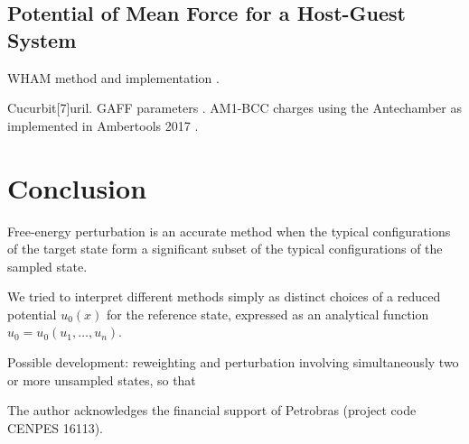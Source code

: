 \documentclass[journal=jctcce,manuscript=article]{achemso}
\begin{document}
\subsection{Potential of Mean Force for a Host-Guest System}

WHAM method\cite{Kumar_1992} and implementation \cite{Grossfield_nodate}.

Cucurbit[7]uril. GAFF parameters \cite{Wang_2004}. AM1-BCC charges \cite{Jakalian_2000, Jakalian_2002} using the Antechamber \cite{Wang_2006} as implemented in Ambertools 2017 \cite{Case_2017}.

\section{Conclusion}

Free-energy perturbation is an accurate method when the typical configurations of the target state form a significant subset of the typical configurations of the sampled state.

We tried to interpret different methods simply as distinct choices of a reduced potential $u_0(x)$ for the reference state, expressed as an analytical function $u_0 = u_0(u_1,\dots,u_n)$.

Possible development: reweighting and perturbation involving simultaneously two or more unsampled states, so that  

\begin{acknowledgement}

The author acknowledges the financial support of Petrobras (project code CENPES 16113).

\end{acknowledgement}


\end{document}
